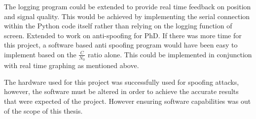 The logging program could be extended to provide real time feedback on position and signal quality. This would be achieved by implementing the serial connection within
the Python code itself rather than relying on the logging function of screen.
Extended to work on anti-spoofing for PhD. If there was more time for this project, a software based anti spoofing program would have been easy to implement based
on the $\frac{C}{N_0}$ ratio alone. This could be implemented in conjunction with real time graphing as mentioned above.

The hardware used for this project was successfully used for spoofing attacks, however, the software must be altered in order to achieve the accurate results that were
expected of the project. However ensuring software capabilities was out of the scope of this thesis.
